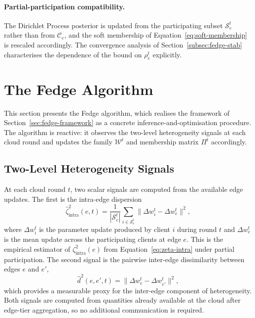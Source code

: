 \paragraph{Partial-participation compatibility.}
The Dirichlet Process posterior is updated from the participating subset $\mathcal{S}_e^t$ rather than from $\mathcal{C}_e$, and the soft membership of Equation~\eqref{eq:soft-membership} is rescaled accordingly. The convergence analysis of Section~\ref{subsec:fedge-stab} characterises the dependence of the bound on $\rho_e^t$ explicitly.

\section{The Fedge Algorithm}
\label{sec:fedge-algorithm}

This section presents the Fedge algorithm, which realises the framework of Section~\ref{sec:fedge-framework} as a concrete inference-and-optimisation procedure. The algorithm is reactive: it observes the two-level heterogeneity signals at each cloud round and updates the family $\mathcal{W}^t$ and membership matrix $\Pi^t$ accordingly.

\subsection{Two-Level Heterogeneity Signals}
\label{subsec:fedge-signals}

At each cloud round $t$, two scalar signals are computed from the available edge updates. The first is the intra-edge dispersion
\begin{equation}
\label{eq:intra-signal}
\hat{\zeta}_{\text{intra}}^{2}(e, t) = \frac{1}{|\mathcal{S}_{e}^{t}|} \sum_{i \in \mathcal{S}_{e}^{t}} \big\| \Delta w_{i}^{t} - \Delta w_{e}^{t} \big\|^{2},
\end{equation}
where $\Delta w_i^t$ is the parameter update produced by client $i$ during round $t$ and $\Delta w_e^t$ is the mean update across the participating clients at edge $e$. This is the empirical estimator of $\zeta_{\text{intra}}^{2}(e)$ from Equation~\eqref{eq:zeta-intra} under partial participation. The second signal is the pairwise inter-edge dissimilarity between edges $e$ and $e'$,
\begin{equation}
\label{eq:inter-signal}
\hat{d}^{2}(e, e', t) = \big\| \Delta w_{e}^{t} - \Delta w_{e'}^{t} \big\|^{2},
\end{equation}
which provides a measurable proxy for the inter-edge component of heterogeneity. Both signals are computed from quantities already available at the cloud after edge-tier aggregation, so no additional communication is required.

